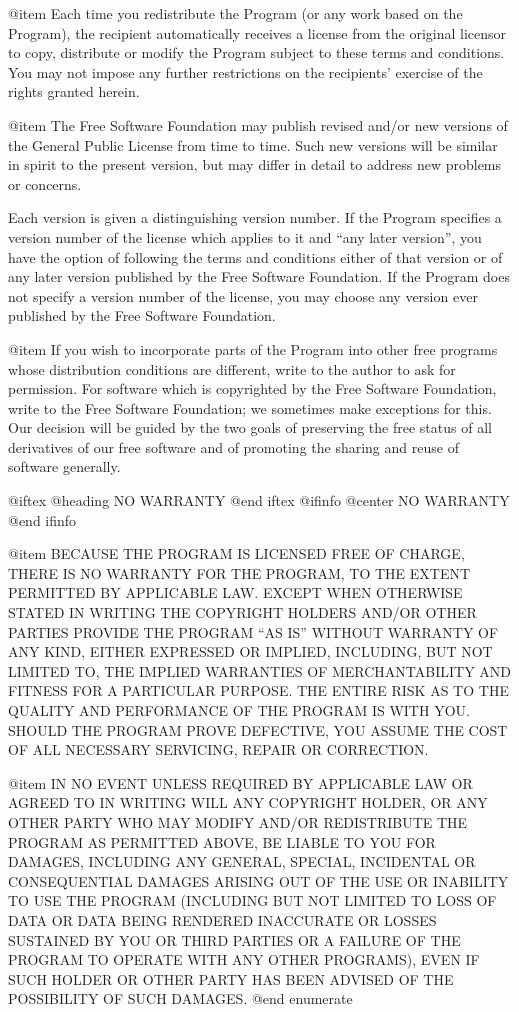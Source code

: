 @item
Each time you redistribute the Program (or any work based on the
Program), the recipient automatically receives a license from the original
licensor to copy, distribute or modify the Program subject to these
terms and conditions.  You may not impose any further restrictions on the
recipients' exercise of the rights granted herein.

@item
The Free Software Foundation may publish revised and/or new versions
of the General Public License from time to time.  Such new versions will
be similar in spirit to the present version, but may differ in detail to
address new problems or concerns.

Each version is given a distinguishing version number.  If the Program
specifies a version number of the license which applies to it and ``any
later version'', you have the option of following the terms and conditions
either of that version or of any later version published by the Free
Software Foundation.  If the Program does not specify a version number of
the license, you may choose any version ever published by the Free Software
Foundation.

@item
If you wish to incorporate parts of the Program into other free
programs whose distribution conditions are different, write to the author
to ask for permission.  For software which is copyrighted by the Free
Software Foundation, write to the Free Software Foundation; we sometimes
make exceptions for this.  Our decision will be guided by the two goals
of preserving the free status of all derivatives of our free software and
of promoting the sharing and reuse of software generally.

@iftex
@heading NO WARRANTY
@end iftex
@ifinfo
@center NO WARRANTY
@end ifinfo

@item
BECAUSE THE PROGRAM IS LICENSED FREE OF CHARGE, THERE IS NO WARRANTY
FOR THE PROGRAM, TO THE EXTENT PERMITTED BY APPLICABLE LAW.  EXCEPT WHEN
OTHERWISE STATED IN WRITING THE COPYRIGHT HOLDERS AND/OR OTHER PARTIES
PROVIDE THE PROGRAM ``AS IS'' WITHOUT WARRANTY OF ANY KIND, EITHER EXPRESSED
OR IMPLIED, INCLUDING, BUT NOT LIMITED TO, THE IMPLIED WARRANTIES OF
MERCHANTABILITY AND FITNESS FOR A PARTICULAR PURPOSE.  THE ENTIRE RISK AS
TO THE QUALITY AND PERFORMANCE OF THE PROGRAM IS WITH YOU.  SHOULD THE
PROGRAM PROVE DEFECTIVE, YOU ASSUME THE COST OF ALL NECESSARY SERVICING,
REPAIR OR CORRECTION.

@item
IN NO EVENT UNLESS REQUIRED BY APPLICABLE LAW OR AGREED TO IN WRITING WILL
ANY COPYRIGHT HOLDER, OR ANY OTHER PARTY WHO MAY MODIFY AND/OR
REDISTRIBUTE THE PROGRAM AS PERMITTED ABOVE, BE LIABLE TO YOU FOR DAMAGES,
INCLUDING ANY GENERAL, SPECIAL, INCIDENTAL OR CONSEQUENTIAL DAMAGES
ARISING OUT OF THE USE OR INABILITY TO USE THE PROGRAM (INCLUDING BUT NOT
LIMITED TO LOSS OF DATA OR DATA BEING RENDERED INACCURATE OR LOSSES
SUSTAINED BY YOU OR THIRD PARTIES OR A FAILURE OF THE PROGRAM TO OPERATE
WITH ANY OTHER PROGRAMS), EVEN IF SUCH HOLDER OR OTHER PARTY HAS BEEN
ADVISED OF THE POSSIBILITY OF SUCH DAMAGES.
@end enumerate

